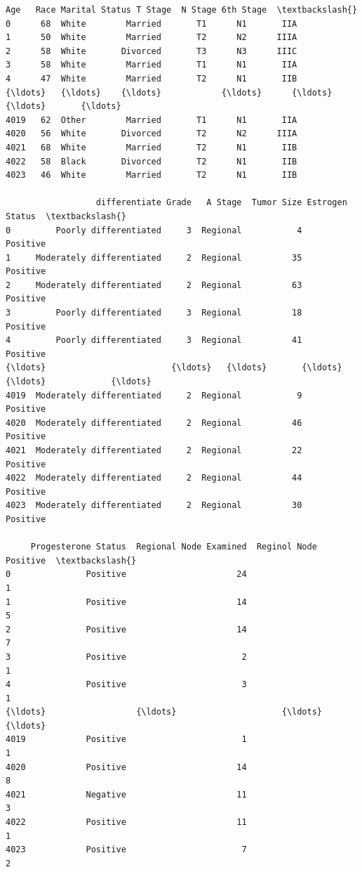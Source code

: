 \documentclass[11pt]{article}
\makeatletter
\newcommand{\boxspacing}{\kern\kvtcb@left@rule\kern\kvtcb@boxsep}
\newcommand{\prompt}[4]{
        {\ttfamily\llap{{\color{#2}[#3]:\hspace{3pt}#4}}\vspace{-\baselineskip}}
    }
\makeatother
\begin{document}
            \begin{tcolorbox}[breakable, size=fbox, boxrule=.5pt, pad at break*=1mm, opacityfill=0]
\prompt{Out}{outcolor}{2}{\boxspacing}
\begin{Verbatim}[commandchars=\\\{\}]
      Age   Race Marital Status T Stage  N Stage 6th Stage  \textbackslash{}
0      68  White        Married       T1      N1       IIA
1      50  White        Married       T2      N2      IIIA
2      58  White       Divorced       T3      N3      IIIC
3      58  White        Married       T1      N1       IIA
4      47  White        Married       T2      N1       IIB
{\ldots}   {\ldots}    {\ldots}            {\ldots}      {\ldots}     {\ldots}       {\ldots}
4019   62  Other        Married       T1      N1       IIA
4020   56  White       Divorced       T2      N2      IIIA
4021   68  White        Married       T2      N1       IIB
4022   58  Black       Divorced       T2      N1       IIB
4023   46  White        Married       T2      N1       IIB

                  differentiate Grade   A Stage  Tumor Size Estrogen Status  \textbackslash{}
0         Poorly differentiated     3  Regional           4        Positive
1     Moderately differentiated     2  Regional          35        Positive
2     Moderately differentiated     2  Regional          63        Positive
3         Poorly differentiated     3  Regional          18        Positive
4         Poorly differentiated     3  Regional          41        Positive
{\ldots}                         {\ldots}   {\ldots}       {\ldots}         {\ldots}             {\ldots}
4019  Moderately differentiated     2  Regional           9        Positive
4020  Moderately differentiated     2  Regional          46        Positive
4021  Moderately differentiated     2  Regional          22        Positive
4022  Moderately differentiated     2  Regional          44        Positive
4023  Moderately differentiated     2  Regional          30        Positive

     Progesterone Status  Regional Node Examined  Reginol Node Positive  \textbackslash{}
0               Positive                      24                      1
1               Positive                      14                      5
2               Positive                      14                      7
3               Positive                       2                      1
4               Positive                       3                      1
{\ldots}                  {\ldots}                     {\ldots}                    {\ldots}
4019            Positive                       1                      1
4020            Positive                      14                      8
4021            Negative                      11                      3
4022            Positive                      11                      1
4023            Positive                       7                      2


\end{Verbatim}
\end{tcolorbox}
\end{document}
